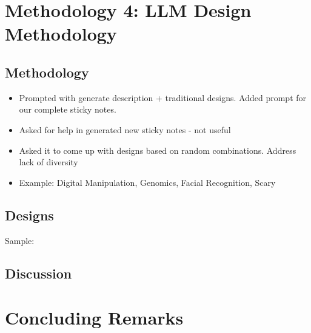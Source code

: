 \section{Methodology 4: LLM Design Methodology}
\label{sec:meth4}

\subsection{Methodology}
\begin{itemize}
\item Prompted with generate description + traditional designs. Added prompt for our complete sticky notes. 
\item Asked for help in generated new sticky notes - not useful
\item Asked it to come up with designs based on random combinations. Address lack of diversity
\item Example: Digital Manipulation, Genomics, Facial Recognition, Scary
\end{itemize}

\subsection{Designs}
Sample:



\subsection{Discussion}



\section{Concluding Remarks}


